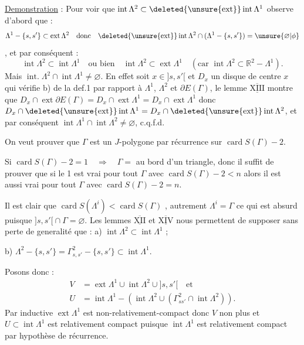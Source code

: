 \uline{Demonstration} : Pour voir que $\operatorname{int}\Lambda^2\subset\deleted{\unsure{\operatorname{ext}}}\operatorname{int}\Lambda^1$  observe d'abord que :
\[
\Lambda^1-\{s,s'\}\subset\operatorname{ext}\Lambda^2\quad\text{donc}\quad\deleted{\unsure{\operatorname{ext}}}\operatorname{int}\Lambda^2\cap(\Lambda^1-\{s,s'\})=\unsure{\varnothing|\phi}
\]
, et par conséquent :
\[
\operatorname{int}\Lambda^2\subset\operatorname{int}\Lambda^1\quad\text{ou bien}\quad\operatorname{int}\Lambda^2\subset\operatorname{ext}\Lambda^1\quad(\text{car }\operatorname{int}\Lambda^2\subset\mathbb R^2-\Lambda^1).
\]
Mais $\operatorname{int.}\Lambda^2\cap\operatorname{int}\Lambda^1\ne\varnothing$. En effet soit $x\in{]s,s'[}$ et $D_x$ un disque de centre $x$ qui vérifie b) de la def.1 par rapport à $\Lambda^1$, $\Lambda^2$ et $\partial E(\Gamma)$, le lemme $\underline{\overline{\mathrm{XIII}}}$ montre que $D_x\cap\operatorname{ext}\partial E(\Gamma)=D_x\cap\operatorname{ext}\Lambda^1=D_x\cap\operatorname{ext}\Lambda^1$ donc $D_x\cap\deleted{\unsure{\operatorname{ext}}}\operatorname{int}\Lambda^1=D_x\cap\deleted{\unsure{\operatorname{ext}}}\operatorname{int}\Lambda^2$, et par conséquent $\operatorname{int}\Lambda^1\cap\operatorname{int}\Lambda^2\ne\varnothing$, c.q.f.d.

On veut prouver que $\Gamma$ est un $J$-polygone par récurrence sur $\operatorname{card}S(\Gamma)-2$.

Si $\operatorname{card}S(\Gamma)-2=1\quad\Rightarrow\quad\Gamma={}$ au bord d'un triangle, donc il suffit de prouver que si le  1 est vrai pour tout $\Gamma$ avec $\operatorname{card}S(\Gamma)-2<n$ alors il est aussi vrai pour tout $\Gamma$ avec $\operatorname{card}S(\Gamma)-2=n$.

Il est clair que $\operatorname{card}S(\Lambda^i)<\operatorname{card}S(\Gamma)$ , autrement $\Lambda^i=\Gamma$ ce qui est absurd puisque $ {]s,s'[}\cap\Gamma=\varnothing$. Les lemmes $\underline{\overline{\mathrm{XII}}}$ et $\underline{\overline{\mathrm{XIV}}}$  nous permettent de supposer sans perte de generalité que : a) $\operatorname{int}\Lambda^2\subset\operatorname{int}\Lambda^1$ ;

b) $\Lambda^2-\{s,s'\}=\Gamma^2_{s,s'}-\{s,s'\}\subset\operatorname{int}\Lambda^1$.

Posons donc :
\[
\begin{aligned}
V&=\operatorname{ext}\Lambda^1\cup\operatorname{int}\Lambda^2\cup{]s,s'[}\quad\text{et}\\
U&=\operatorname{int}\Lambda^1-(\operatorname{int}\Lambda^2\cup(\Gamma^2_{ss'}\cap\operatorname{int}\Lambda^2)).
\end{aligned}
\]
Par  inductive $\operatorname{ext}\Lambda^1$ est non-relativement-compact donc $V$ non plus et $U\subset\operatorname{int}\Lambda^1$ est relativement compact puisque $\operatorname{int}\Lambda^1$ est relativement compact par hypothèse de récurrence.

